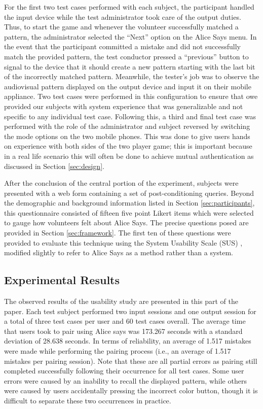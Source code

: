 For the first two test cases performed with each subject, the participant
handled the input device while the test administrator took care of the output
duties. Thus, to start the game and whenever the volunteer successfully matched
a pattern, the administrator selected the ``Next'' option on the Alice Says
menu. In the event that the participant committed a mistake and did not
successfully match the provided pattern, the test conductor pressed a
``previous'' button to signal to the device that it should create a new pattern
starting with the last bit of the incorrectly matched pattern. Meanwhile, the
tester's job was to observe the audiovisual pattern displayed on the output
device and input it on their mobile appliance. Two test cases were performed in
this configuration to ensure that owe provided our subjects with system
experience that was generalizable and not specific to any individual test case.
Following this, a third and final test case was performed with the role of the
administrator and subject reversed by switching the mode options on the two
mobile phones. This was done to give users hands on experience with both sides
of the two player game; this is important because in a real life scenario this
will often be done to achieve mutual authentication as discussed in Section
\ref{sec:design}.

After the conclusion of the central portion of the experiment, subjects were
presented with a web form containing a set of post-conditioning queries. Beyond
the demographic and background information listed in Section
\ref{sec:participants}, this questionnaire consisted of fifteen five point
Likert items which were selected to gauge how volunteers felt about Alice Says.
The precise questions posed are provided in Section \ref{sec:framework}. The
first ten of these questions were provided to evaluate this technique using the
System Usability Scale (SUS) \cite{sus}, modified slightly to refer to Alice
Says as a method rather than a system.

\subsection{Experimental Results}

The observed results of the usability study are presented in this part of the
paper. Each test subject performed two input sessions and one output session
for a total of three test cases per user and 60 test cases overall. The average
time that users took to pair using Alice says was 173.267 seconds with a
standard deviation of 28.638 seconds. In terms of reliability, an average of
1.517 mistakes were made while performing the pairing process (i.e., an average
of 1.517 mistakes per pairing session).  Note that these are all partial errors
as pairing still completed successfully following their occurrence for all test
cases.  
Some user errors were caused by
an inability to recall the displayed pattern, while others were caused by users
accidentally pressing the incorrect color button, though it is difficult to
separate these two occurrences in practice.

